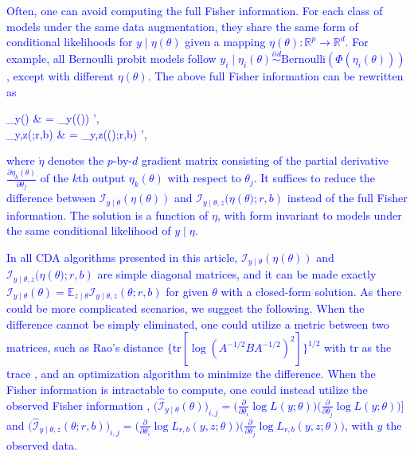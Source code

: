 \documentclass[11pt]{article}
\newcommand{\leojames}[1]{\textcolor{blue}{#1}}
\newcommand{\be}{\begin{equs}}
\newcommand{\ee}{\end{equs}}
\newcommand{\bb}[1]{\mathbb{#1}}
\newcommand{\mc}[1]{\mathcal{#1}}
\newcommand{\Bern}{\text{Bernoulli}}
\begin{document}
\leojames{
Often, one can avoid computing the full Fisher information. For  each class of models under the same data augmentation, they share the same form of conditional likelihoods for $y\mid \eta(\theta)$ given a mapping $\eta(\theta):\bb
R^p\rightarrow \bb R^d $.
 For example,  all Bernoulli probit models  follow $y_{i}\mid \eta_{i}(\theta) \stackrel{iid}{\sim}\Bern( \Phi(\eta_{i}(\theta)) )$, except with different  $\eta(\theta)$. The above full Fisher information can be rewritten as
 \be\mc I_{y\mid \theta}({\theta})  &  =  \dot \eta\mc I_{y\mid \theta}(\eta({\theta}))  \dot \eta', \\
  \mc I_{y\mid \theta,z}({\theta};r,b) & = \dot \eta\mc I_{y\mid \theta,z}(\eta({\theta)};r,b)  \dot \eta',
\ee
where $\dot \eta$ denotes the $p$-by-$d$ gradient matrix consisting of the partial
derivative $\frac{\partial
\eta_{k}(\theta)}{\partial \theta_j}$ of  the $k$th output 
$\eta_{k}(\theta)$ with respect to $\theta_j$. It suffices to reduce the difference between  $\mc I_{y\mid \theta}(\eta({\theta}))$  and $\mc I_{y\mid \theta,z}(\eta({\theta)};r,b)$ instead of the full Fisher
 information. The solution is a function of $\eta$, with form invariant to models under the same conditional likelihood of $y\mid \eta$.
 }


\leojames{
In all CDA algorithms presented in
this article,  $\mc I_{y\mid \theta}(\eta({\theta}))$  and $\mc I_{y\mid \theta,z}(\eta({\theta)};r,b)$ are simple diagonal matrices, and 
 it can be made exactly $\mc I_{y\mid \theta}({\theta})=\bb E_{z\mid \theta}\mc I_{y\mid \theta,z}({\theta};r,b)$ for given $\theta$ with a closed-form
solution. As there could be more complicated
scenarios, we suggest the following. When the difference cannot
be simply eliminated, one could utilize a metric between two matrices, such
as Rao's distance $\{\text{tr}
[\log(A^{-1/2}BA^{-1/2})^{2}]\}^{1/2}$ with $\text{tr}$ as the trace \citep{atkinson1981rao},
and an optimization algorithm to minimize the difference. When the Fisher information
is intractable to compute, one could instead utilize the observed Fisher information
\citep{efron1978assessing},    
 $\bigg(\hat{\mc I}_{y\mid \theta}({\theta}) \bigg)_{i,j}   =  \bigg( \frac{\partial}{\partial \theta_i} \log L(y;\theta) \bigg) \bigg( \frac{\partial}{\partial \theta_j} \log L(y;\theta) \bigg) \bigg]$ and $ 
 \bigg(  \hat{\mc I}_{y\mid \theta,z}({\theta};r,b) \bigg)_{i,j} = \bigg( \frac{\partial}{\partial \theta_i} \log L_{r,b}(y,z;\theta) \bigg)\bigg( \frac{\partial}{\partial \theta_j} \log L_{r,b}(y,z;\theta) \bigg) $, with $y$ the observed data.
}
\end{document}
